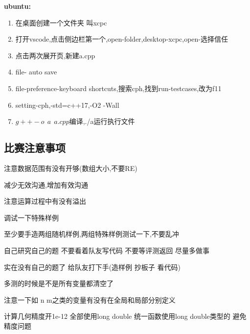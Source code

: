 \documentclass[a4paper,fontset=none]{ctexart}
\begin{document}
\textbf{ubuntu:}
\begin{enumerate}
\item 在桌面创建一个文件夹 叫xcpc
\item 打开vscode,点击侧边栏第一个,open-folder,desktop-xcpc,open-选择信任
\item 点击两次展开页,新建a.cpp
\item file- auto save
\item file-preference-keyboard shortcuts,搜索cph,找到run-testcases,改为f11
\item setting-cph,-std=c++17,-O2 -Wall
\item ${g++ -o \ \ a \ \ a.cpp }$编译,./a运行执行文件
\end{enumerate}
\subsection{比赛注意事项}

注意数据范围有没有开够(数组大小,不要RE)

减少无效沟通,增加有效沟通

注意运算过程中有没有溢出

调试一下特殊样例

至少要手造两组随机样例,两组特殊样例测试一下,不要乱冲

自己研究自己的题 不要看着队友写代码 不要等评测返回 尽量多做事

实在没有自己的题了 给队友打下手(造样例 抄板子 看代码)

多测的时候是不是所有变量都清空了

注意一下如 n m之类的变量有没有在全局和局部分别定义

计算几何精度开1e-12 全部使用long double 统一函数使用long double类型的 避免精度问题
\end{document}
